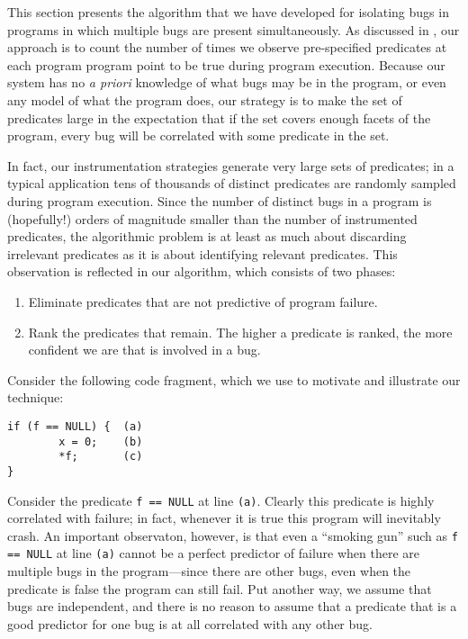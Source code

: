 
This section presents the algorithm that we have developed for
isolating bugs in programs in which multiple bugs are present
simultaneously.  As discussed in , our
approach is to count the number of times we observe pre-specified
predicates at each program program point to be true during program
execution.  Because our system has no {\em a priori} knowledge of what bugs
may be in the program, or even any model of what the program does, our
strategy is to make the set of predicates large in the expectation that
if the set covers enough facets of the program, every bug will be correlated
with some predicate in the set.

In fact, our instrumentation strategies generate very large sets
of predicates; in a typical application tens of thousands of distinct
predicates are randomly sampled during program execution.  Since the
number of distinct bugs in a program is (hopefully!) orders of
magnitude smaller than the number of instrumented predicates, the
algorithmic problem is at least as much about discarding irrelevant
predicates as it is about identifying relevant predicates.  This
observation is reflected in our algorithm, which consists of two phases:
\begin{enumerate}
\item Eliminate predicates that are not predictive of program failure.

\item Rank the predicates that remain.  The higher a predicate is ranked,
the more confident we are that is involved in a bug.
\end{enumerate}

Consider the following code fragment, which we use to motivate and illustrate
our technique:
\begin{verbatim}
if (f == NULL) {  (a)
        x = 0;    (b)
        *f;       (c)
}
\end{verbatim}
Consider the predicate {\tt f == NULL} at line {\tt (a)}.  Clearly
this predicate is highly correlated with failure; in fact, whenever it
is true this program will inevitably crash.  An important observaton,
however, is that even a ``smoking gun'' such as {\tt f == NULL} at
line {\tt (a)} cannot be a perfect predictor of failure when there are
multiple bugs in the program---since there are other bugs, even when
the predicate is false the program can still fail.  Put another way, we assume
that bugs are independent, and there is no reason to assume that
a predicate that is a good predictor for one bug is at all correlated
with any other bug.


